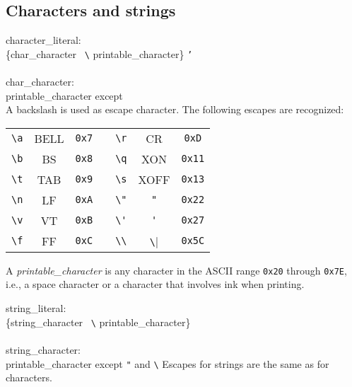 \subsection{Characters and strings}\label{sec:idchar}

\grammarstart
character\_literal: \\
       \{char\_character \orbox \ \verb|\| printable\_character\} {\tt{}'} \\
 \\
char\_character: \\
      \>printable\_character except {\tt{}\\}
\grammarend
A backslash is used as escape character. The following escapes are
recognized:

\begin{center}
\begin{tabular}{||c|c|c||c||c|c|c||}
\cline{1-3} \cline{5-7}
\verb|\a| & BELL & \verb|0x7| & \hspace{1.5in} & \verb|\r| & CR & \verb|0xD| \\
\cline{1-3} \cline{5-7}
\verb|\b| & BS   & \verb|0x8| &  & \verb|\q| & XON      & \verb|0x11| \\
\cline{1-3} \cline{5-7}
\verb|\t| & TAB  & \verb|0x9| &  & \verb|\s| & XOFF     & \verb|0x13| \\
\cline{1-3} \cline{5-7}
\verb|\n| & LF   & \verb|0xA| &  & \verb|\"| & \verb|"| & \verb|0x22| \\
\cline{1-3} \cline{5-7}
\verb|\v| & VT   & \verb|0xB| &  & \verb|\'| & \verb|'| & \verb|0x27| \\
\cline{1-3} \cline{5-7}
\verb|\f| & FF   & \verb|0xC| &  & \verb|\\| & \verb|\| & \verb|0x5C| \\
\cline{1-3} \cline{5-7}
\end{tabular}
\end{center}

A {\it{}printable\_character} is any character in the ASCII range
{\tt{}0x20} through {\tt{}0x7E}, i.e., a space character or a character that involves
ink when printing.

\grammarstart
string\_literal: \\
       \{string\_character \orbox \ \verb|\| printable\_character\} \\
 \\
string\_character: \\
      \>printable\_character except {\tt{}"} and \verb|\|
\grammarend
Escapes for strings are the same as for characters.




